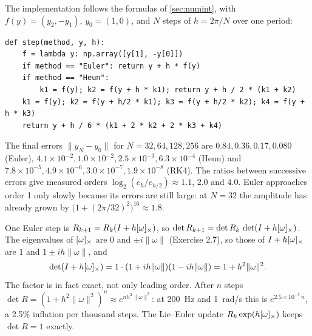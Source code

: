 \begin{solutions}
  \item The implementation follows the formulas of \cref{sec:numint}, with $f(y) = (y_2, -y_1)$, $y_0 = (1, 0)$, and $N$ steps of $h = 2\pi/N$ over one
        period:
\begin{lstlisting}[style=py]
def step(method, y, h):
    f = lambda y: np.array([y[1], -y[0]])
    if method == "Euler": return y + h * f(y)
    if method == "Heun":
        k1 = f(y); k2 = f(y + h * k1); return y + h / 2 * (k1 + k2)
    k1 = f(y); k2 = f(y + h/2 * k1); k3 = f(y + h/2 * k2); k4 = f(y + h * k3)
    return y + h / 6 * (k1 + 2 * k2 + 2 * k3 + k4)
\end{lstlisting}
        The final errors $\|y_N - y_0\|$ for $N = 32, 64, 128, 256$ are $0.84, 0.36, 0.17, 0.080$ (Euler), $4.1\times10^{-2}, 1.0\times10^{-2},
        2.5\times10^{-3}, 6.3\times10^{-4}$ (Heun) and $7.8\times10^{-5}, 4.9\times10^{-6}, 3.0\times10^{-7}, 1.9\times10^{-8}$ (RK4). The ratios between
        successive errors give measured orders $\log_2(e_h/e_{h/2}) \approx 1.1$, $2.0$ and $4.0$. Euler approaches order 1 only slowly because its
        errors are still large: at $N = 32$ the amplitude has already grown by $\big(1 + (2\pi/32)^2\big)^{16} \approx 1.8$.

  \item One Euler step is $R_{k+1} = R_k(I + h[\omega]_{\times})$, so $\det R_{k+1} = \det R_k\,\det(I + h[\omega]_{\times})$. The eigenvalues of $[\omega]_{\times}$ are $0$
        and $\pm i\|\omega\|$ (Exercise 2.7), so those of $I + h[\omega]_{\times}$ are $1$ and $1 \pm ih\|\omega\|$, and
        \[
          \det(I + h[\omega]_{\times}) = 1\cdot(1 + ih\|\omega\|)(1 - ih\|\omega\|) = 1 + h^2\|\omega\|^2 .
        \]
        The factor is in fact exact, not only leading order. After $n$ steps $\det R = (1 + h^2\|\omega\|^2)^n \approx e^{nh^2\|\omega\|^2}$: at 200~Hz and
        1~rad/s this is $e^{2.5\times10^{-5}\,n}$, a 2.5\% inflation per thousand steps. The Lie--Euler update $R_k\exp(h[\omega]_{\times})$ keeps $\det R = 1$ exactly.


\end{solutions}
